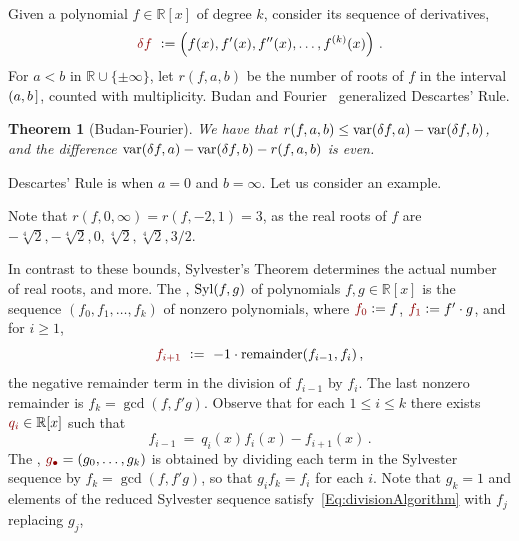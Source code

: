 \documentclass[12pt]{amsart}
\newtheorem{theorem}{Theorem}
\theoremstyle{definition}
\newcommand{\RR}{\mathbb{R}}
\DeclareMathOperator{\var}{{\rm var}}
\DeclareMathOperator{\Syl}{{\rm Syl}}
\newcommand{\defcolor}[1]{{\color{TAMU}#1}}
\newcommand{\demph}[1]{\defcolor{{\sl #1}}}
\begin{document}
Given a polynomial $f\in\RR[x]$ of degree $k$, consider its sequence of derivatives,
%
 \[
   \defcolor{\delta f}\ \vcentcolon= \left(f(x),f'(x),f''(x),\dots,f^{(k)}(x)\right)\,.
 \]
%
For $a<b$ in $\RR\cup\{\pm \infty\}$, let \defcolor{$r(f,a,b)$} be the number of roots of $f$ in the interval $(a,b\hspace{.05cm}]$, counted
with multiplicity.
Budan and Fourier~\cite[Ch.\ 2]{So_Book} generalized Descartes' Rule.

\begin{theorem}[Budan-Fourier]
  We have that $r(f,a,b)\leq \var(\delta f,a) -\var(\delta f,b)$, and the difference
  $\var(\delta f,a) -\var(\delta f,b)-r(f,a,b)$ is even. 
\end{theorem}

Descartes' Rule is when $a=0$ and $b=\infty$.
Let us consider an example.
%
\begin{leftbar}

\end{leftbar}
%
Note that $r(f,0,\infty)=r(f,-2,1)=3$, as the real roots of $f$ are $-\sqrt[4]{2},-\sqrt[4]{2},0,\sqrt[4]{2},\sqrt[4]{2},3/2$.

In contrast to these bounds, 
Sylvester's Theorem determines the actual number of real roots, and more.
The \demph{Sylvester sequence}, \defcolor{$\Syl(f,g)$} of polynomials $f,g\in\RR[x]$ is the sequence
$\left(f_0,f_1,\dotsc,f_k\right)$ of nonzero polynomials, where $\defcolor{f_0}\vcentcolon= f$, $\defcolor{f_1}\vcentcolon= f'\cdot g$,
and for $i\geq 1$, 
%
  \[
    \defcolor{f_{i+1}}\ \vcentcolon=\ -1\cdot \mbox{remainder}(f_{i-1},f_i)\,,
  \]
%
the negative remainder term in the division of $f_{i-1}$ by $f_i$.
The last nonzero remainder is $f_k = \gcd(f,f'g)$.
Observe that for each $1\leq i\leq k$ there exists $\defcolor{q_i}\in\RR[x]$ such that
%
 \begin{equation}\label{Eq:divisionAlgorithm}
    f_{i-1}\ =\ q_i(x)f_i(x)-f_{i+1}(x)\,.
 \end{equation}
%
The \demph{reduced Sylvester sequence}, $\defcolor{g_\bullet}=(g_0,\dotsc,g_k)$ is obtained by dividing each term in the Sylvester sequence
by $f_k=\gcd(f,f'g)$, so that $g_if_k=f_i$ for each $i$. 
Note that  $g_k=1$ and elements of the reduced Sylvester sequence satisfy~\eqref{Eq:divisionAlgorithm} with $f_j$ replacing $g_j$,
\end{document}
